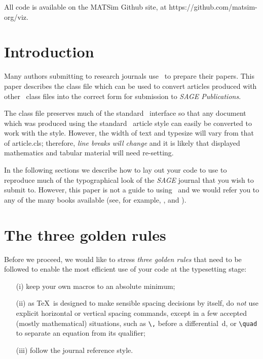 \documentclass[Afour,sageh,times]{sagej}
\begin{document}
All code is available on the MATSim Github site, at https://github.com/matsim-org/viz.




\section{Introduction}
Many authors submitting to research journals use \LaTeXe\ to
prepare their papers. This paper describes the
\textsf{\journalclass} class file which can be used to convert
articles produced with other \LaTeXe\ class files into the correct
form for submission to \textit{SAGE Publications}.

The \textsf{\journalclass} class file preserves much of the
standard \LaTeXe\ interface so that any document which was
produced using the standard \LaTeXe\ \textsf{article} style can
easily be converted to work with the \textsf{\journalclassshort}
style. However, the width of text and typesize will vary from that
of \textsf{article.cls}; therefore, \textit{line breaks will change}
and it is likely that displayed mathematics and tabular material
will need re-setting.

In the following sections we describe how to lay out your code to
use \textsf{\journalclass} to reproduce much of the typographical look of
the \textit{SAGE} journal that you wish to submit to. However, this paper is not a guide to
using \LaTeXe\ and we would refer you to any of the many books
available (see, for example, \cite{R1}, \cite{R2} and \cite{R3}).

\section{The three golden rules}
Before we proceed, we would like to stress \textit{three golden
rules} that need to be followed to enable the most efficient use
of your code at the typesetting stage:
\begin{enumerate}
\item[(i)] keep your own macros to an absolute minimum;

\item[(ii)] as \TeX\ is designed to make sensible spacing
decisions by itself, do \textit{not} use explicit horizontal or
vertical spacing commands, except in a few accepted (mostly
mathematical) situations, such as \verb"\," before a
differential~d, or \verb"\quad" to separate an equation from its
qualifier;

\item[(iii)] follow the journal reference style.
\end{enumerate}
\end{document}
